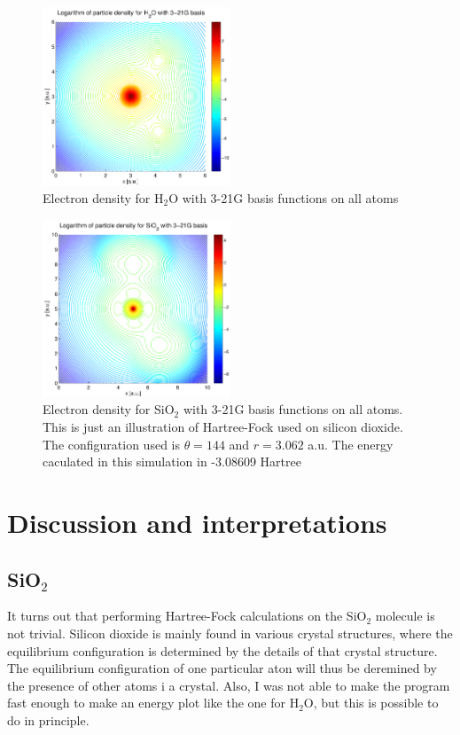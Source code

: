 \documentclass[a4paper,10pt, twocolumn, pre]{revtex4}
\begin{document}
\begin{figure}[h!tb]
\includegraphics[width=0.5\textwidth]{./figures/H2Odensity_321g.pdf}
\caption{Electron density for H$_2$O with 3-21G basis functions on all atoms}
\label{fig:density6}
\end{figure}

\begin{figure}[h!tb]
\includegraphics[width=0.5\textwidth]{./figures/SiO2density_321g.pdf}
\caption{Electron density for SiO$_2$ with 3-21G basis functions on all atoms. This is just an illustration of Hartree-Fock used on silicon dioxide. The configuration used is $\theta=144$ and $r = 3.062$ a.u. The energy caculated in this simulation in -3.08609 Hartree}
\end{figure}

\section{Discussion and interpretations}

\subsection{SiO$_2$}
It turns out that performing Hartree-Fock calculations on the SiO$_2$ molecule is not trivial. Silicon dioxide is mainly found in various crystal structures, where the equilibrium configuration is determined by the details of that crystal structure. The equilibrium configuration of one particular aton will thus be deremined by the presence of other atoms i a crystal. Also, I was not able to make the program fast enough to make an energy plot like the one for H$_2$O, but this is possible to do in principle. 
\end{document}
